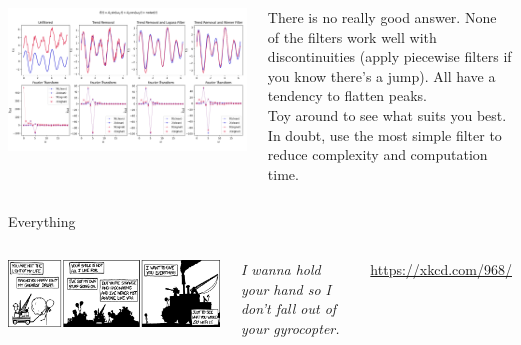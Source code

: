 \begin{frame}
%
\begin{columns}
\includegraphics[width=\linewidth]{./gfx/05-filters}
%
\begin{hintbox}
\footnotesize
There is no really good answer. None of the filters work well with discontinuities (apply piecewise filters if you know there's a jump). All have a tendency to flatten peaks.\\
Toy around to see what suits you best. In doubt, use the most simple filter to reduce complexity and computation time.
\end{hintbox}
\end{columns}
%
\end{frame}


\begin{frame}{Everything}
%
\begin{columns}
\begin{center}
\includegraphics[width=\linewidth]{./gfx/05-xkcd-everything}\\
\end{center}
%
\small
	\emph{I wanna hold your hand so I don't fall out of your gyrocopter.}

	\vspace{6pt}
	\url{https://xkcd.com/968/}
\end{columns}
%
\end{frame}


